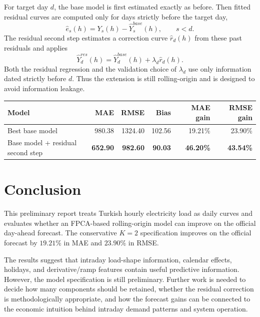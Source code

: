 \documentclass[10pt,a4paper]{article}
\begin{document}
For target day
\(d\), the base model is first estimated exactly as before. Then fitted residual
curves are computed only for days strictly before the target day,
\[
\widehat e_s(h)=Y_s(h)-\widehat Y_s^{base}(h),
\qquad s<d.
\]
The residual second step estimates a correction curve \(\widehat r_d(h)\) from these
past residuals and applies
\[
\widehat Y_d^{res}(h)=\widehat Y_d^{base}(h)+\lambda_d\widehat r_d(h).
\]
Both the residual regression and the validation choice of \(\lambda_d\) use only
information dated strictly before \(d\). Thus the extension is still rolling-origin
and is designed to avoid information leakage.



\begin{center}
\fontsize{8.2}{9.5}\selectfont
\begin{tabular}{p{}rrrrr}
\hline
Model & MAE & RMSE & Bias & MAE gain & RMSE gain\\
\hline
Best base model & 980.38 & 1324.40 & 102.56 & 19.21\% & 23.90\%\\
Base model + residual second step & {\bf 652.90} & {\bf 982.60} & {\bf 90.03} & {\bf 46.20\%} & {\bf 43.54\%}\\
\hline
\end{tabular}
\end{center}

\fontsize{9.2}{10.8}\selectfont


\section*{Conclusion}

This preliminary report treats Turkish hourly electricity load as daily curves and
evaluates whether an FPCA-based rolling-origin model can improve on the official
day-ahead forecast. The conservative \(K=2\) specification improves on the official
forecast by \(19.21\%\) in MAE and \(23.90\%\) in RMSE.

The results suggest that intraday load-shape information, calendar effects, holidays,
and derivative/ramp features contain useful predictive information. However, the
model specification is still preliminary. Further work is needed to decide how many
components should be retained, whether the residual correction is methodologically
appropriate, and how the forecast gains can be connected to the economic intuition
behind intraday demand patterns and system operation.
\end{document}
